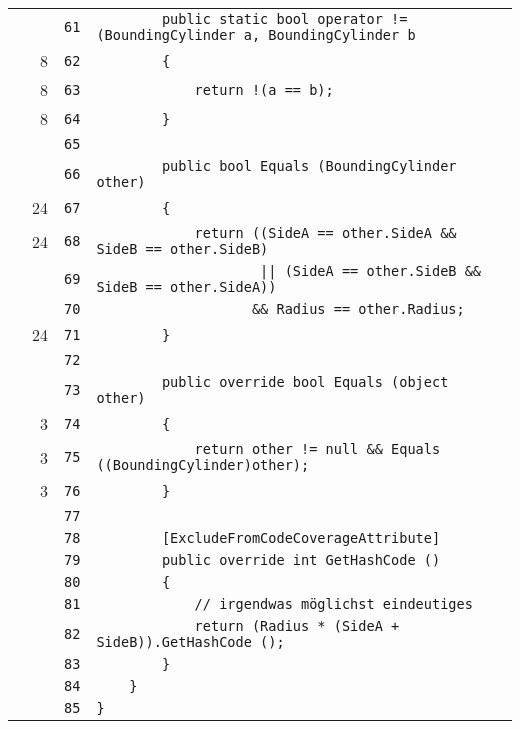 \documentclass[a4paper,10pt]{article}
\begin{document}
\begin{longtable}[l]{lrrl}
\cellcolor{gray} &  & \verb~61~ & \verb~        public static bool operator != (BoundingCylinder a, BoundingCylinder b~\\
\cellcolor{green} & 8 & \verb~62~ & \verb~        {~\\
\cellcolor{green} & 8 & \verb~63~ & \verb~            return !(a == b);~\\
\cellcolor{green} & 8 & \verb~64~ & \verb~        }~\\
\cellcolor{gray} &  & \verb~65~ & \verb~~\\
\cellcolor{gray} &  & \verb~66~ & \verb~        public bool Equals (BoundingCylinder other)~\\
\cellcolor{green} & 24 & \verb~67~ & \verb~        {~\\
\cellcolor{green} & 24 & \verb~68~ & \verb~            return ((SideA == other.SideA && SideB == other.SideB)~\\
\cellcolor{gray} &  & \verb~69~ & \verb~                    || (SideA == other.SideB && SideB == other.SideA))~\\
\cellcolor{gray} &  & \verb~70~ & \verb~                   && Radius == other.Radius;~\\
\cellcolor{green} & 24 & \verb~71~ & \verb~        }~\\
\cellcolor{gray} &  & \verb~72~ & \verb~~\\
\cellcolor{gray} &  & \verb~73~ & \verb~        public override bool Equals (object other)~\\
\cellcolor{green} & 3 & \verb~74~ & \verb~        {~\\
\cellcolor{green} & 3 & \verb~75~ & \verb~            return other != null && Equals ((BoundingCylinder)other);~\\
\cellcolor{green} & 3 & \verb~76~ & \verb~        }~\\
\cellcolor{gray} &  & \verb~77~ & \verb~~\\
\cellcolor{gray} &  & \verb~78~ & \verb~        [ExcludeFromCodeCoverageAttribute]~\\
\cellcolor{gray} &  & \verb~79~ & \verb~        public override int GetHashCode ()~\\
\cellcolor{gray} &  & \verb~80~ & \verb~        {~\\
\cellcolor{gray} &  & \verb~81~ & \verb~            // irgendwas möglichst eindeutiges~\\
\cellcolor{gray} &  & \verb~82~ & \verb~            return (Radius * (SideA + SideB)).GetHashCode ();~\\
\cellcolor{gray} &  & \verb~83~ & \verb~        }~\\
\cellcolor{gray} &  & \verb~84~ & \verb~    }~\\
\cellcolor{gray} &  & \verb~85~ & \verb~}~\\
\end{longtable}
\newpage
\end{document}
